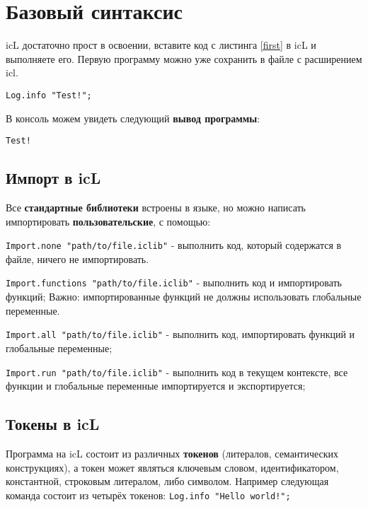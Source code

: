 \section{Базовый синтаксис}

icL достаточно прост в освоении, вставите код с листинга \ref{first} в icL и выполняете его. Первую программу можно уже сохранить в файле с расширением icl.

\begin{lstlisting}[caption=Первая программа, label=first]
Log.info "Test!";
\end{lstlisting}

В консоль можем увидеть следующий \textbf{вывод программы}:

\begin{lstlisting}[numbers=none]
Test!
\end{lstlisting}

\subsection{Импорт в icL}

Все \textbf{стандартные библиотеки} встроены в языке, но можно написать импортировать \textbf{пользовательские}, с помощью:

\begin{icItems}
\item
	\lstinline|Import.none "path/to/file.iclib"| - выполнить код, который содержатся в файле, ничего не импортировать.
\item
	\lstinline|Import.functions "path/to/file.iclib"| - выполнить код и импортировать функций; {\color{red}Важно:} импортированные функций не должны использовать глобальные переменные.
\item
	\lstinline|Import.all "path/to/file.iclib"| -  выполнить код, импортировать функций и глобальные переменные;
\item
	\lstinline|Import.run "path/to/file.iclib"| - выполнить код в текущем контексте, все функции и глобальные переменные импортируется и экспортируется;
\end{icItems}

\subsection{Токены в icL}

Программа на icL состоит из различных \textbf{токенов} (литералов, семантических конструкциях), а токен может являться ключевым словом, идентификатором, константной, строковым литералом, либо символом. Например следующая команда состоит из четырёх токенов: \lstinline`Log.info "Hello world!";`

